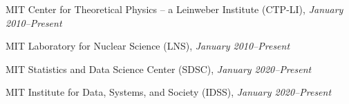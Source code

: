 \bbl
\item MIT Center for Theoretical Physics -- a Leinweber Institute (CTP-LI), \emph{January 2010--Present}
\item MIT Laboratory for Nuclear Science (LNS), \emph{January 2010--Present}
\item MIT Statistics and Data Science Center (SDSC), \emph{January 2020--Present}
\item MIT Institute for Data, Systems, and Society (IDSS), \emph{January 2020--Present}
\el
